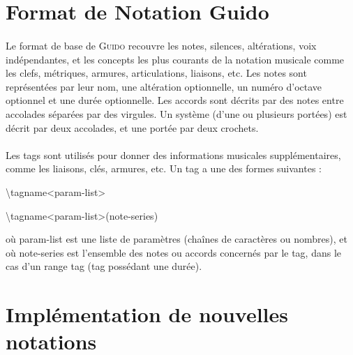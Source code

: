 \documentclass[a4paper,10pt,twocolumn]{article}
\newenvironment{code}
  {\fontfamily{pnc}\selectfont}{}
\begin{document}
\section{Format de Notation Guido}


\paragraph{}
Le format de base de \textsc{Guido} recouvre les notes, silences, altérations, voix indépendantes, et les concepts les plus courants de la notation musicale comme les clefs, métriques, armures, articulations, liaisons, etc.
Les notes sont représentées par leur nom, une altération optionnelle, un numéro d’octave optionnel et une durée optionnelle. Les accords sont décrits par des notes entre accolades séparées par des virgules. Un système (d'une ou plusieurs portées) est décrit par deux accolades, et une portée par deux crochets.


\paragraph{}
Les tags sont utilisés pour donner des informations musicales supplémentaires, comme les liaisons, clés, armures, etc. Un tag a une des formes suivantes : 

\begin{code}
\textbackslash{}tagname\textless{}param-list\textgreater{}

\textbackslash{}tagname\textless{}param-list\textgreater{}(note-series)
\end{code}

où param-list est une liste de paramètres (chaînes de caractères ou nombres), et où note-series est l'ensemble des notes ou accords concernés par le tag, dans le cas d'un range tag (tag possédant une durée).

\section{Implémentation de nouvelles notations}
\end{document}
